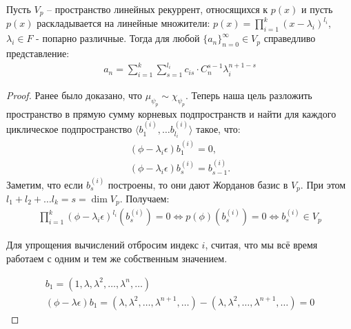 \begin{theorem}
    Пусть $V_p$ -- пространство линейных рекуррент, относящихся к $p(x)$ и пусть $p(x)$ 
    раскладывается на линейные множители: $p(x) = \displaystyle\prod_{i=1}^{k}(x -\lambda_i)^{l_i}$,
    $\lambda_i \in F$ - попарно различные.
    Тогда для любой $\{a_n\}_{n=0}^{\infty} \in V_p$ справедливо представление:
    \begin{gather*}
        a_n = \sum_{i=1}^{k}\sum_{s=1}^{l_i} c_{is} \cdot C_n^{s - 1} \lambda_i^{n + 1 - s}
    \end{gather*}
\end{theorem}

\begin{proof}
    Ранее было доказано, что $\mu_{\psi_p} \sim \chi_{\psi_p}$. Теперь наша цель разложить пространство 
    в прямую сумму корневых подпространств и найти для каждого циклическое подпространство 
    $\langle b_1^{(i)}, \dots b_{l_i}^{(i)} \rangle$ такое, что:
    \begin{gather*}
        (\phi - \lambda_i \epsilon)b_1^{(i)} = 0, \\
        (\phi - \lambda_i \epsilon) b_{s}^{(i)} = b_{s-1}^{(i)}.
    \end{gather*}
    Заметим, что если $b_s^{(i)}$ построены, то они дают Жорданов базис в $V_p$. 
    При этом $l_1 + l_2 +\dots l_k = s = \dim V_p$. Получаем:
    \begin{gather*}
        \prod_{i=1}^{k}(\phi - \lambda_i \epsilon)^{l_i} (b_s^{(i)}) = 0 \Leftrightarrow p(\phi) (b_s^{(i)}) = 0 \Leftrightarrow b_s^{(i)} \in V_p
    \end{gather*}

    Для упрощения вычислений отбросим индекс $i$, считая, что мы всё время работаем с одним и тем же собственным значением.

    \begin{gather*}
        b_1 = (1, \lambda, \lambda^2, \dots, \lambda^n, \dots) \\
        (\phi - \lambda \epsilon)b_1 = (\lambda, \lambda^2, \dots, \lambda^{n + 1}, \dots) - (\lambda, \lambda^2, \dots, \lambda^{n + 1}, \dots) = 0
    \end{gather*}


\end{proof}
